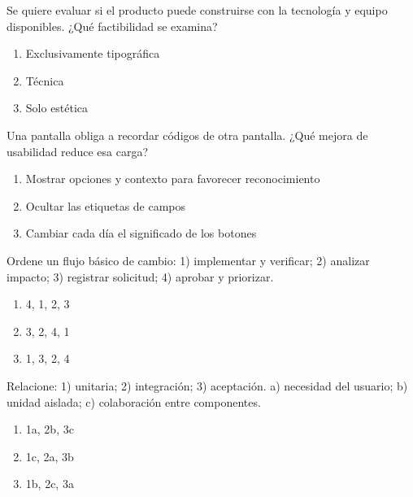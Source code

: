 \noindent\begin{minipage}{\linewidth}\setlength{\parskip}{4pt}\label{q:S-020}
Se quiere evaluar si el producto puede construirse con la tecnología y equipo disponibles. ¿Qué factibilidad se examina?
\begin{enumerate}[label=\Alph*),nosep]
\item Exclusivamente tipográfica
\item Técnica
\item Solo estética
\end{enumerate}\end{minipage}\par\medskip

\noindent\begin{minipage}{\linewidth}\setlength{\parskip}{4pt}\label{q:S-021}
Una pantalla obliga a recordar códigos de otra pantalla. ¿Qué mejora de usabilidad reduce esa carga?
\begin{enumerate}[label=\Alph*),nosep]
\item Mostrar opciones y contexto para favorecer reconocimiento
\item Ocultar las etiquetas de campos
\item Cambiar cada día el significado de los botones
\end{enumerate}\end{minipage}\par\medskip

\noindent\begin{minipage}{\linewidth}\setlength{\parskip}{4pt}\label{q:S-022}
Ordene un flujo básico de cambio: 1) implementar y verificar; 2) analizar impacto; 3) registrar solicitud; 4) aprobar y priorizar.
\begin{enumerate}[label=\Alph*),nosep]
\item 4, 1, 2, 3
\item 3, 2, 4, 1
\item 1, 3, 2, 4
\end{enumerate}\end{minipage}\par\medskip

\noindent\begin{minipage}{\linewidth}\setlength{\parskip}{4pt}\label{q:S-023}
Relacione: 1) unitaria; 2) integración; 3) aceptación. a) necesidad del usuario; b) unidad aislada; c) colaboración entre componentes.
\begin{enumerate}[label=\Alph*),nosep]
\item 1a, 2b, 3c
\item 1c, 2a, 3b
\item 1b, 2c, 3a
\end{enumerate}\end{minipage}\par\medskip

